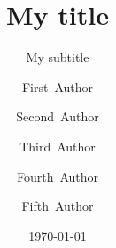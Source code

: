 
\title{My title}
\subtitle{My subtitle}
\author{First~Author \and 
  Second~Author \and
  Third~Author \and
  Fourth~Author \and
  Fifth~Author}
\date{\today}

\begin{frame}
    \titlepage
\end{frame}